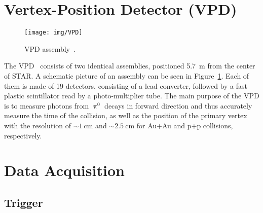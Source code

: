 \section{Vertex-Position Detector (VPD)\label{VPD}}

\begin{figure}[htb]
\begin{center}
 \texttt{[image: img/VPD]}\\
\end{center}
\caption{\label{VPDassembly}VPD assembly~\cite{VPD}.}
\end{figure}

The VPD~\cite{VPD} consists of two identical assemblies, positioned \SI{5.7}{\metre} from the center of STAR\@. A schematic 
picture of an assembly can be seen in Figure~\ref{VPDassembly}. Each of them is made of 19 detectors, consisting of a lead 
converter, followed by a fast plastic scintillator read by a photo-multiplier tube. The main purpose of the VPD is to measure 
photons from $\uppi^0$ decays in forward direction and thus accurately measure the time of the collision, as well as 
the position of the primary vertex with the resolution of $\sim \SI{1}{\centi\metre}$ and  $\sim \SI{2.5}{\centi\metre}$ 
for Au+Au and p+p collisions, respectively.

\section{Data Acquisition}
\subsection{Trigger}

